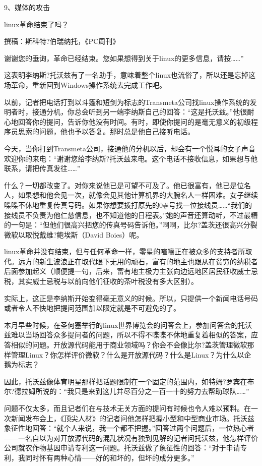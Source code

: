  
9、媒体的攻击

 

linux革命结束了吗？

撰稿：斯科特?伯瑞纳托，《PC周刊》

谢谢您的垂询，革命已经结束。您如果想得到关于linux的更多信息，请按……”

这表明李纳斯?托沃兹有了一名助手，意味着整个linux也流俗了，所以还是忘掉这场革命，重新回到Windows操作系统去完成工作吧。

以前，记者把电话打到以斗篷和短剑为标志的Transmeta公司找linux操作系统的发明者时，接通分机，你总会听到另一端李纳斯自己的回答：“这是托沃兹。”他很耐心地回答你的提问，告诉你他没有时间。有时，即使你提问的是毫无意义的初级程序员思索的问题，他也予以答复。那时总是他自己接听电话。

今天，当你打到Transmeta公司，接通他的分机以后，却会有一个悦耳的女子声音欢迎你的来电：“谢谢您给李纳斯?托沃兹来电。这个电话不接收信息，如果想与他联系，请把传真发往……”

什么？一切都改变了。对你来说他已是可望不可及了。他已很富有，他已是位名人，如果想和他会见一次，就像会见其他计算机界的大腕名人一样困难。女子继续喋喋不休地重复传真号码。如果你想要拨打原先的0\#号找一位接线员……“我们的接线员不负责为他仁慈信息，也不知道他的日程表。”她的声音还算动听，不过最糟的一句是：“但他们很高兴把您的传真号码告诉他。”啊啊，比尔?盖茨还很高兴分裂微软以取悦戴维?鲍埃斯（David Boies）呢。

linux革命并没有结束，但与任何革命一样，零星的喧嚷正在被众多的支持者所取代。远方的新生波浪正在取代眼下无用的顽石，富有的地主也跟从在贫穷的纳税者后面参加起义（顺便提一句，后来，富有地主极力主张向边远地区居民征收威士忌税，其实威士忌税与以前向他们征收的茶叶税没有多大区别）。

实际上，这正是李纳斯开始变得毫无意义的时候。所以，只提供一个新闻电话号码或者令人不快地把提问范围加以限定就是不可避免的了。

本月早些时候，在圣何塞举行的linux世界博览会的问答会上，参加问答会的托沃兹难以当场回答众多提问者的问题，所以不得不喋喋不休地重复着相似的答案，应答相似的问题。开放源代码能用于商业领域吗？你会不会像比尔?盖茨管理微软那样管理Linux？你怎样评价微软？什么是开放源代码？什么是Linux？为什么以企鹅为标志？

因此，托沃兹像体育明星那样把话题限制在一个固定的范围内，如特姆?罗宾在布尔?德拉姆所说的：“我只是来到这儿并尽百分之一百一十的努力去帮助球队……”

问题不仅太多，而且记者们在与技术无关方面的提问有时候也令人难以预料。在一次新闻发布会上，《顶尖人材》的记者问他怎样把握小型和中型商业市场。托沃兹象征性地回答：“就个人来说，我一个都不把握。”回答过两个问题后，一位热心者——一名自以为对开放源代码的混乱状况有独到见解的记者问托沃兹，他怎样评价公司就农作物基因申请专利这一问题。托沃兹做了象征性的回答：“对于申请专利，我同时怀有两种心情——好的和坏的，但坏的成分更多。”

